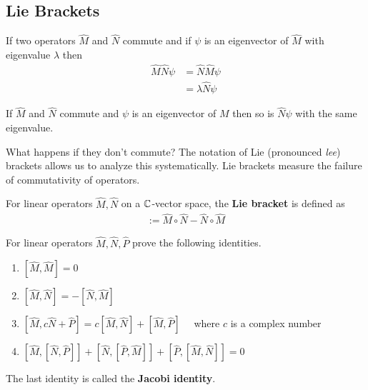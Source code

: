 \subsection{Lie Brackets}
If two operators $\hat{M}$ and $\hat{N}$ commute and if $\psi$ is an eigenvector of $\hat{M}$ with eigenvalue $\lambda$ then
\begin{align*}
	\hat{M} \hat{N} \psi
	&= \hat{N} \hat{M} \psi \\
	&= \lambda \hat{N} \psi
\end{align*}
\begin{prop}
	If $\hat{M}$ and $\hat{N}$ commute and $\psi$ is an eigenvector of $M$ then so is $\hat{N} \psi$ with the same eigenvalue.
\end{prop}

What happens if they don't commute? The notation of Lie (pronounced \emph{lee}) brackets allows us to analyze this systematically.
Lie  brackets measure the failure of commutativity of operators.
\begin{definition}
	For linear operators $\hat{M}, \hat{N}$ on a $\mathbb{C}$-vector space, the \textbf{Lie bracket} is defined as
	\begin{align*}
		[\hat{M}, \hat{N}] := \widehat{M} \circ \widehat{N} - \widehat{N} \circ \widehat{M}
	\end{align*}
\end{definition}

\begin{ques}
	For linear operators $\hat{M}, \hat{N}, \hat{P}$ prove the following identities.
	\begin{enumerate}
		\item $[\hat{M}, \hat{M}] = 0$
		\item $[\hat{M}, \hat{N}] = -[\hat{N}, \hat{M}]$
		\item $[\hat{M}, c \hat{N} + \hat{P}] = c[\hat{M}, \hat{N}] + [\hat{M}, \hat{P}]\quad $ where $c$ is a complex number
		\item $[\hat{M}, [\hat{N}, \hat{P}]] + [\hat{N}, [\hat{P}, \hat{M}]] + [\hat{P}, [\hat{M}, \hat{N}]] = 0$
	\end{enumerate}
	The last identity is called the \textbf{Jacobi identity}.
\end{ques}

